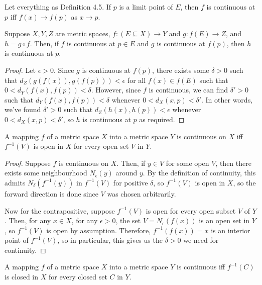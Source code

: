 \begin{theorem} %
    Let everything as Definition 4.5. If $p$ is a limit point of $E$, then $f$ is continuous at $p$ iff $f(x) \to f(p)$ as $x \to p$.
\end{theorem}

\begin{theorem} %
    Suppose $X, Y, Z$ are metric spaces, $f: (E \subseteq X) \to Y$ and $g: f(E) \to Z$, and $h = g \circ f$. Then, if $f$ is continuous at $p \in E$ and $g$ is continuous at $f(p)$, then $h$ is continuous at $p$.

\begin{proof}
    Let $\epsilon > 0$. Since $g$ is continuous at $f(p)$, there exists some $\delta > 0$ such that $d_Z(g(f(x)), g(f(p))) < \epsilon$ for all $f(x) \in f(E)$ such that $0 < d_Y(f(x), f(p)) < \delta$. However, since $f$ is continuous, we can find $\delta' > 0$ such that $d_Y(f(x), f(p)) < \delta$ whenever $0 < d_X(x, p) < \delta'$. In other words, we've found $\delta' > 0$ such that $d_Z(h(x), h(p)) < \epsilon$ whenever $0 < d_X(x, p) < \delta'$, so $h$ is continuous at $p$ as required.
\end{proof}
\end{theorem}

\begin{theorem} %
    A mapping $f$ of a metric space $X$ into a metric space $Y$ is continuous on $X$ iff $f^{-1}(V)$ is open in $X$ for every open set $V$ in $Y$.

\begin{proof}
    Suppose $f$ is continuous on $X$. Then, if $y \in V$ for some open $V$, then there exists some neighbourhood $N_{\epsilon}(y)$ around $y$. By the definition of continuity, this admits $N_{\delta}(f^{-1}(y))$ in $f^{-1}(V)$ for positive $\delta$, so $f^{-1}(V)$ is open in $X$, so the forward direction is done since $V$ was chosen arbitrarily.

    Now for the contrapositive, suppose $f^{-1}(V)$ is open for every open subset $V$ of $Y$. Then, for any $x \in X$, for any $\epsilon > 0$, the set $V = N_\epsilon(f(x))$ is an open set in $Y$, so $f^{-1}(V)$ is open by assumption. Therefore, $f^{-1}(f(x)) = x$ is an interior point of $f^{-1}(V)$, so in particular, this gives us the $\delta > 0$ we need for continuity.
\end{proof}
\end{theorem}

\begin{corollary} %
    A mapping $f$ of a metric space $X$ into a metric space $Y$ is continuous iff $f^{-1}(C)$ is closed in $X$ for every closed set $C$ in $Y$.
\end{corollary}

